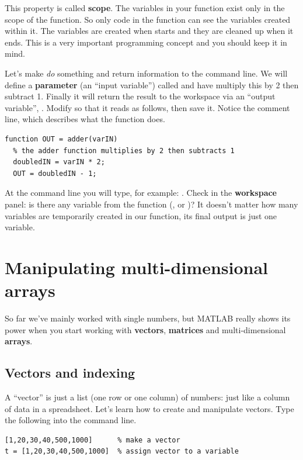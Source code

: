 \documentclass{article}
\begin{document}
This property is called \textbf{scope}.
The variables in your  function exist only in the scope of the  function.
So only code in the  function can see the variables created within it.
The variables are created when  starts and they are cleaned up when it ends.
This is a very important programming concept and you should keep it in mind.

Let's make  \emph{do} something and return information to the command line.
We will define a \textbf{parameter} (an ``input variable'') called  and have  multiply this by 2 then subtract 1.
Finally it will return the result to the workspace via an ``output variable'', .
Modify  so that it reads as follows, then save it.
Notice the comment line, which describes what the function does.
\begin{lstlisting}
function OUT = adder(varIN)
  % the adder function multiplies by 2 then subtracts 1
  doubledIN = varIN * 2;
  OUT = doubledIN - 1;
\end{lstlisting}

At the command line you will type, for example: .
Check in the \textbf{workspace} panel: is there any variable from the function (,  or )?
It doesn't matter how many variables are temporarily created in our function, its final output is just one variable.


\pagebreak
\section{Manipulating multi-dimensional arrays}

So far we've mainly worked with single numbers, but MATLAB really shows its power when you start working with \textbf{vectors}, \textbf{matrices} and multi-dimensional \textbf{arrays}.


\subsection{Vectors and indexing}

A ``vector'' is just a list (one row or one column) of numbers: just like a column of data in a spreadsheet.
Let's learn how to create and manipulate vectors.
Type the following into the command line.
\begin{lstlisting}
[1,20,30,40,500,1000]      % make a vector
t = [1,20,30,40,500,1000]  % assign vector to a variable
\end{lstlisting}
\end{document}
